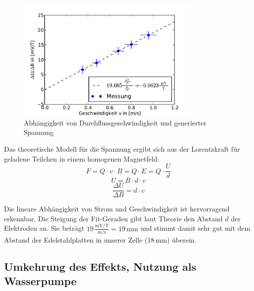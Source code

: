 \documentclass[11pt]{scrartcl}
\newcommand{\unit}[1]{\ensuremath{\,\mathrm{#1}}} %
\begin{document}
\begin{figure}[ht]
\begin{center}
\includegraphics[width=0.8\textwidth]{images/v-U.pdf}
\end{center}
\vspace{-1.5\baselineskip}
\caption{Abhängigkeit von Durchflussgeschwindigkeit und generierter Spannung}
\label{v-U}
\end{figure}

Das theoretische Modell für die Spannung ergibt sich aus der Lorentzkraft für geladene Teilchen in einem homogenen Magnetfeld:
\begin{equation}
F=Q\cdot v\cdot B = Q \cdot E = Q \cdot \frac{U}{d}
\end{equation}
\begin{equation}
U=B \cdot d \cdot v
\end{equation}
\begin{equation}
\frac{\Delta U}{\Delta B}=d \cdot v
\end{equation}

Die lineare Abhängigkeit von Strom und Geschwindigkeit ist hervorragend erkennbar. Die Steigung der Fit-Geraden gibt laut Theorie den Abstand $d$ der Elektroden an. Sie beträgt $19 \unit{\frac{ mV/T }{ m/s }} = 19 \unit{mm}$ und stimmt damit sehr gut mit dem Abstand der Edelstahlplatten in unserer Zelle (18\unit{mm}) überein.


\subsection{Umkehrung des Effekts, Nutzung als Wasserpumpe}		%
\end{document}
